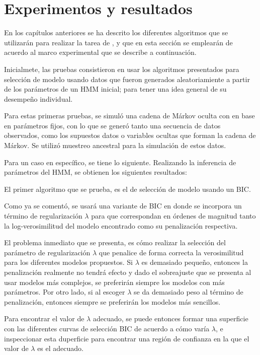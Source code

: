 
\chapter{Experimentos y resultados}\label{ch:chap5}

En los capítulos anteriores se ha descrito los diferentes algoritmos que se utilizarán para realizar la tarea de \sd, y que en esta sección se emplearán de acuerdo al marco experimental que se describe a continuación.

Inicialmete, las pruebas consistieron en usar los algoritmos presentados para selección de modelo usando datos que fueron generados aleatoriamiente a partir de los parámetros de un HMM inicial; para tener una idea general de su desempeño individual.

Para estas primeras pruebas, se simuló una cadena de Márkov oculta con en base en parámetros fijos, con lo que se generó tanto una secuencia de datos observados, como los supuestos datos o variables ocultas que forman la cadena de Márkov. Se utilizó muestreo ancestral para la simulación de estos datos.

Para un caso en específico, se tiene lo siguiente. Realizando la inferencia de parámetros del HMM, se obtienen los siguientes resultados:

El primer algoritmo que se prueba, es el de selección de modelo usando un BIC.

Como ya se comentó, se usará una variante de BIC en donde se incorpora un término de regularización $\lambda$ para que correspondan en órdenes de magnitud tanto la log-verosimilitud del modelo encontrado como su penalización respectiva.

El problema inmediato que se presenta, es cómo realizar la selección del parámetro de regularización $\lambda$ que penalice de forma correcta la verosimilitud para los diferentes modelos propuestos. Si $\lambda$ es demasiado pequeño, entonces la penalización realmente no tendrá efecto y dado el sobreajuste que se presenta al usar modelos más complejos, se preferirán siempre los modelos con más parámetros. Por otro lado, si al escoger $\lambda$ se da demasiado peso al término de penalización, entonces siempre se preferirán los modelos más sencillos.

Para encontrar el valor de $\lambda$ adecuado, se puede entonces formar una superficie con las diferentes curvas de selección BIC de acuerdo a cómo varía $\lambda$, e inspeccionar esta duperficie para encontrar una región de confianza en la que el valor de $\lambda$ es el adecuado.

